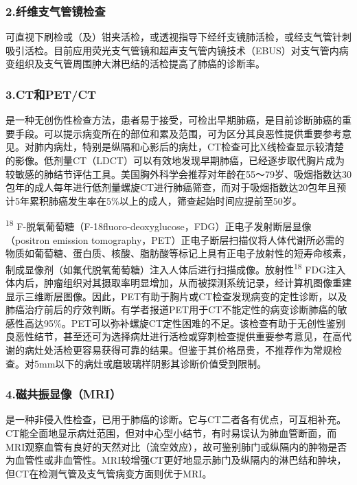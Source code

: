 \subsubsection{2.纤维支气管镜检查}

可直视下刷检或（及）钳夹活检，或透视指导下经纤支镜肺活检，或经支气管针刺吸引活检。目前应用荧光支气管镜和超声支气管内镜技术（EBUS）对支气管内病变组织及支气管周围肿大淋巴结的活检提高了肺癌的诊断率。

\subsubsection{3.CT和PET/CT}

是一种无创伤性检查方法，患者易于接受，可检出早期肺癌，是目前诊断肺癌的重要手段。可以提示病变所在的部位和累及范围，可为区分其良恶性提供重要参考意见。对肺内病灶，特别是纵隔和心影后的病灶，CT检查可比X线检查显示较清楚的影像。低剂量CT（LDCT）可以有效地发现早期肺癌，已经逐步取代胸片成为较敏感的肺结节评估工具。美国胸外科学会推荐对年龄在55～79岁、吸烟指数达30包年的成人每年进行低剂量螺旋CT进行肺癌筛查，而对于吸烟指数达20包年且预计5年累积肺癌发生率在5\%以上的成人，筛查起始时间应提前至50岁。

\textsuperscript{18}
F-脱氧葡萄糖（F-18fluoro-deoxyglucose，FDG）正电子发射断层显像（positron
emission
tomography，PET）正电子断层扫描仪将人体代谢所必需的物质如葡萄糖、蛋白质、核酸、脂肪酸等标记上具有正电子放射性的短寿命核素，制成显像剂（如氟代脱氧葡萄糖）注入人体后进行扫描成像。放射性\textsuperscript{18}
FDG注入体内后，肿瘤组织对其摄取率明显增加，从而被探测系统记录，经计算机图像重建显示三维断层图像。因此，PET有助于胸片或CT检查发现病变的定性诊断，以及肺癌治疗前后的疗效判断。有学者报道PET用于CT不能定性的病变诊断肺癌的敏感性高达95\%。PET可以弥补螺旋CT定性困难的不足。该检查有助于无创性鉴别良恶性结节，甚至还可为选择病灶进行活检或穿刺检查提供重要参考意见，在高代谢的病灶处活检更容易获得可靠的结果。但鉴于其价格昂贵，不推荐作为常规检查。对5mm以下的病灶或磨玻璃样阴影其诊断价值受到限制。

\subsubsection{4.磁共振显像（MRI）}

是一种非侵入性检查，已用于肺癌的诊断。它与CT二者各有优点，可互相补充。CT能全面地显示病灶范围，但对中心型小结节，有时易误认为肺血管断面，而MRI观察血管有良好的天然对比（流空效应），故可鉴别肺门或纵隔内的肿物是否为血管性或非血管性。MRI较增强CT更好地显示肺门及纵隔内的淋巴结和肿块，但CT在检测气管及支气管病变方面则优于MRI。

